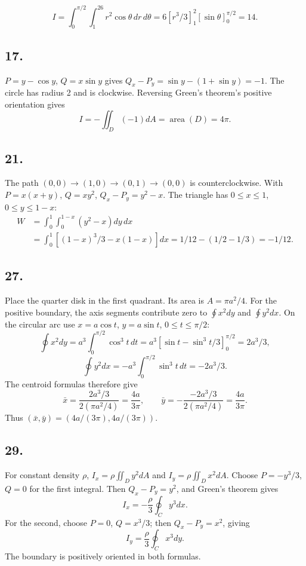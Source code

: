 \documentclass[11pt]{article}
\newcommand{\ex}[1]{\subsection*{#1.}}
\newcommand{\ans}[1]{\boxed{#1}}
\begin{document}
\[I=\int_0^{\pi/2}\int_1^26r^2\cos\theta\,dr\,d\theta
=6[r^3/3]_1^2[\sin\theta]_0^{\pi/2}=\ans{14}.\]
\ex{17}
$P=y-\cos y$, $Q=x\sin y$ gives $Q_x-P_y=\sin y-(1+\sin y)=-1$. The circle has radius 2 and is clockwise. Reversing Green's theorem's positive orientation gives
\[I=-\iint_D(-1)dA=\operatorname{area}(D)=\ans{4\pi}.\]
\ex{21}
The path $(0,0)\to(1,0)\to(0,1)\to(0,0)$ is counterclockwise. With $P=x(x+y)$, $Q=xy^2$, $Q_x-P_y=y^2-x$. The triangle has $0\le x\le1$, $0\le y\le1-x$:
\begin{align*}
W&=\int_0^1\int_0^{1-x}(y^2-x)dy\,dx\\
&=\int_0^1[(1-x)^3/3-x(1-x)]dx
=1/12-(1/2-1/3)=\ans{-1/12}.
\end{align*}
\ex{27}
Place the quarter disk in the first quadrant. Its area is $A=\pi a^2/4$. For the positive boundary, the axis segments contribute zero to $\oint x^2dy$ and $\oint y^2dx$. On the circular arc use $x=a\cos t$, $y=a\sin t$, $0\le t\le\pi/2$:
\[\oint x^2dy=a^3\int_0^{\pi/2}\cos^3t\,dt
=a^3[\sin t-\sin^3t/3]_0^{\pi/2}=2a^3/3,\]
\[\oint y^2dx=-a^3\int_0^{\pi/2}\sin^3t\,dt=-2a^3/3.\]
The centroid formulas therefore give
\[\bar x=\frac{2a^3/3}{2(\pi a^2/4)}=\frac{4a}{3\pi},\qquad
\bar y=-\frac{-2a^3/3}{2(\pi a^2/4)}=\frac{4a}{3\pi}.\]
Thus $\ans{(\bar x,\bar y)=(4a/(3\pi),4a/(3\pi))}$.
\ex{29}
For constant density $\rho$, $I_x=\rho\iint_Dy^2dA$ and $I_y=\rho\iint_Dx^2dA$. Choose $P=-y^3/3$, $Q=0$ for the first integral. Then $Q_x-P_y=y^2$, and Green's theorem gives
\[\ans{I_x=-\frac\rho3\oint_Cy^3dx}.\]
For the second, choose $P=0$, $Q=x^3/3$; then $Q_x-P_y=x^2$, giving
\[\ans{I_y=\frac\rho3\oint_Cx^3dy}.\]
The boundary is positively oriented in both formulas.
\end{document}
